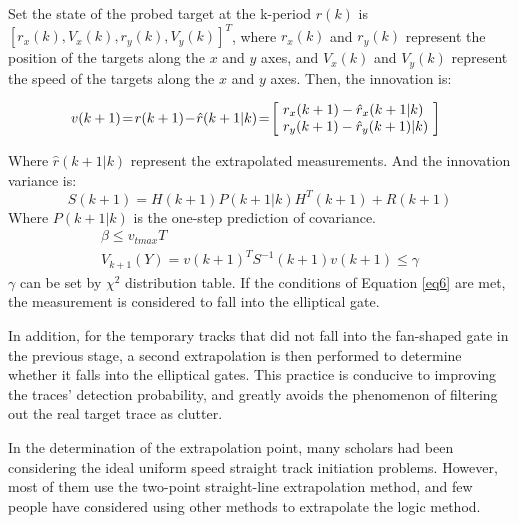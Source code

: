 \documentclass[default,iicol]{sn-jnl}%
\theoremstyle{thmstyleone}%
\theoremstyle{thmstyletwo}%
\theoremstyle{thmstylethree}%
\begin{document}
Set the state of the probed target at the k-period $r(k)$ is $[ r _ { x } ( k ) , V _ { x } ( k ) , r _ { y } ( k ) , V _ { y } ( k ) ] ^ { T }$, where $r_{ x } ( k )$ and $r_{ y } ( k )$ represent the position of the targets along the $x$ and $y$ axes, and $V_{ x } ( k )$ and $V_ { y }( k )$ represent the speed of the targets along the $x$ and $y$ axes. Then, the innovation is:
\begin{footnotesize}
    \begin{equation}\label{eq4}
        \hspace{-2mm}
        v ( k + 1 )\! =\! r ( k + 1 )\! -\! \hat{r} ( k + 1 \vert k )                           \! = \!\left[\! \begin{array}  { l  }  { r _ { x } ( k + 1 ) - \hat{r} _ { x } ( k + 1 \vert k ) } \\ { r _ { y } ( k + 1 ) - \hat{r} _ { y } ( k + 1 ) \vert k ) } \end{array} \!\right]
    \end{equation}
\end{footnotesize}
Where $\hat{r} ( k + 1 \vert k )$ represent the extrapolated measurements. And the innovation variance is:
\begin{equation}
    \!S ( k + 1 ) = H ( k + 1 ) P ( k + 1 \vert k ) H ^ { T } ( k + 1 ) + R ( k + 1 )\!
    \label{eq5}
\end{equation}
Where $ P ( k + 1 \vert k )$  is the one-step prediction of covariance.
\begin{equation}
    \!\left. \begin{array}  { l  }  { \beta \leq v _ { t m a x } T } \\ { V _ { k + 1 } ( Y ) = v ( k + 1 ) ^ { T } S ^ { - 1 } ( k + 1 ) v ( k + 1 ) \leq \gamma  } \end{array} \right.\!
    \label{eq6}
\end{equation}
$\gamma$ can be set by $\chi^2$ distribution table. If the conditions of Equation \ref{eq6} are met, the measurement is considered to fall into the elliptical gate.

In addition, for the temporary tracks that did not fall into the fan-shaped gate in the previous stage, a second extrapolation is then performed to determine whether it falls into the elliptical gates. This practice is conducive to improving the traces' detection probability, and greatly avoids the phenomenon of filtering out the real target trace as clutter.

In the determination of the extrapolation point, many scholars had been considering the ideal uniform speed straight track initiation problems. However, most of them use the two-point straight-line extrapolation method, and few people have considered using other methods to extrapolate the logic method.
\end{document}
